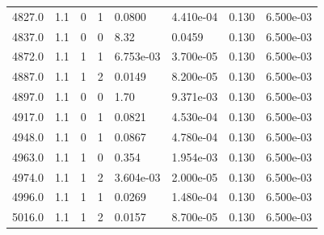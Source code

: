 \documentclass[preview]{standalone}
\begin{document}
{{{{{{{{{\begin{tabular}{L{1.2cm}C{1.2cm} C{0.3cm}C{0.5cm} C{1.4cm}C{1.4cm} C{1.4cm}C{1.4cm}}
  4827.0  &   1.1  & 0     &  1 &  0.0800  & 4.410e-04  & 0.130 &  6.500e-03   \\ 
  4837.0  &   1.1  & 0     &  0 &  8.32  & 0.0459  & 0.130 &  6.500e-03   \\ 
  4872.0  &   1.1  & 1     &  1 &  6.753e-03  & 3.700e-05  & 0.130 &  6.500e-03   \\ 
  4887.0  &   1.1  & 1     &  2 &  0.0149  & 8.200e-05  & 0.130 &  6.500e-03   \\ 
  4897.0  &   1.1  & 0     &  0 &  1.70  & 9.371e-03  & 0.130 &  6.500e-03   \\ 
  4917.0  &   1.1  & 0     &  1 &  0.0821  & 4.530e-04  & 0.130 &  6.500e-03   \\ 
  4948.0  &   1.1  & 0     &  1 &  0.0867  & 4.780e-04  & 0.130 &  6.500e-03   \\ 
  4963.0  &   1.1  & 1     &  0 &  0.354  & 1.954e-03  & 0.130 &  6.500e-03   \\ 
  4974.0  &   1.1  & 1     &  2 &  3.604e-03  & 2.000e-05  & 0.130 &  6.500e-03   \\ 
  4996.0  &   1.1  & 1     &  1 &  0.0269  & 1.480e-04  & 0.130 &  6.500e-03   \\ 
  5016.0  &   1.1  & 1     &  2 &  0.0157  & 8.700e-05  & 0.130 &  6.500e-03   \\ 
\hline 
\end{tabular} 

}}}}}}}}}
\end{document}
